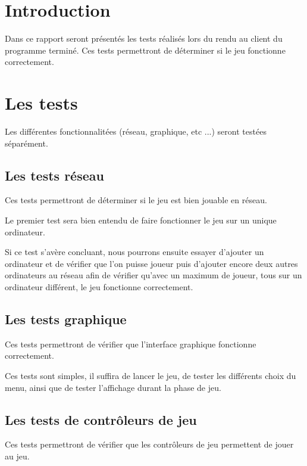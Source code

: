 \section*{Introduction}

Dans ce rapport seront présentés les tests réalisés lors du rendu au client du programme terminé. Ces tests permettront de déterminer si le jeu fonctionne correctement.

\newpage

\section{Les tests}

Les différentes fonctionnalitées (réseau, graphique, etc ...) seront testées séparément.

\subsection{Les tests réseau}

Ces tests permettront de déterminer si le jeu est bien jouable en réseau.

Le premier test sera bien entendu de faire fonctionner le jeu sur un unique ordinateur.

Si ce test s'avère concluant, nous pourrons ensuite essayer d'ajouter un ordinateur et de vérifier que l'on puisse joueur puis d'ajouter encore deux autres ordinateurs au réseau afin de vérifier qu'avec un maximum de joueur, tous sur un ordinateur différent, le jeu fonctionne correctement.

\subsection{Les tests graphique}

Ces tests permettront de vérifier que l'interface graphique fonctionne correctement.

Ces tests sont simples, il suffira de lancer le jeu, de tester les différents choix du menu, ainsi que de tester l'affichage durant la phase de jeu.

\subsection{Les tests de contrôleurs de jeu}

Ces tests permettront de vérifier que les contrôleurs de jeu permettent de jouer au jeu.



